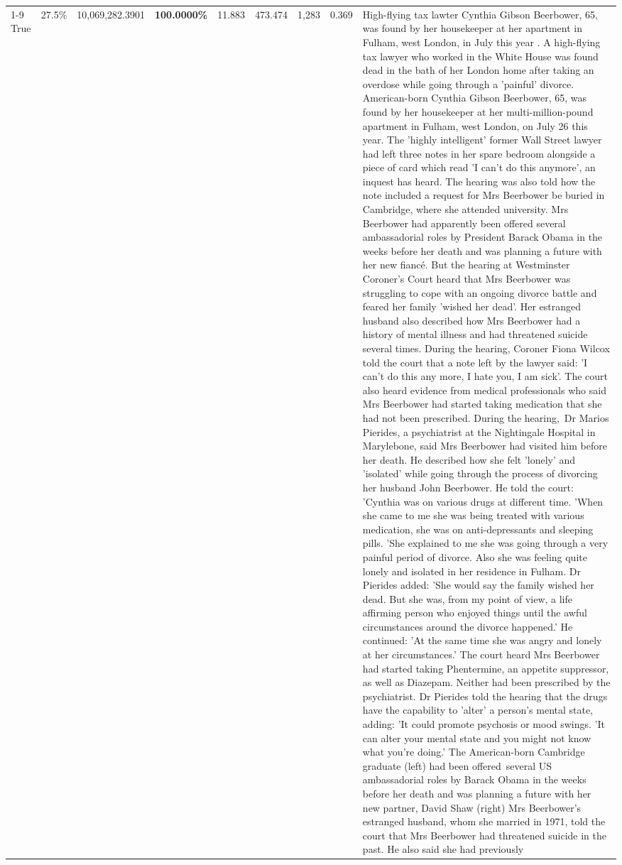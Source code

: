 \begin{table}[H]
\begin{tabular}{lllrlllll}
\cline{1-9}
True & 27.5\% & 10,069,282.3901 & \bfseries \color{red} 100.0000\% & 11.883 & 473.474 & 1,283 & 0.369 & High-flying tax lawter Cynthia Gibson Beerbower, 65, was found by her housekeeper at her apartment in Fulham, west London, in July this year . A high-flying tax lawyer who worked in the White House was found dead in the bath of her London home after taking an overdose while going through a 'painful' divorce. American-born Cynthia Gibson Beerbower, 65, was found by her housekeeper at her multi-million-pound apartment in Fulham, west London, on July 26 this year. The 'highly intelligent' former Wall Street lawyer had left three notes in her spare bedroom alongside a piece of card which read 'I can't do this anymore', an inquest has heard. The hearing was also told how the note included a request for Mrs Beerbower be buried in Cambridge, where she attended university. Mrs Beerbower had apparently been offered several ambassadorial roles by President Barack Obama in the weeks before her death and was planning a future with her new fiancé. But the hearing at Westminster Coroner's Court heard that Mrs Beerbower was struggling to cope with an ongoing divorce battle and feared her family 'wished her dead'. Her estranged husband also described how Mrs Beerbower had a history of mental illness and had threatened suicide several times. During the hearing, Coroner Fiona Wilcox told the court that a note left by the lawyer said: 'I can't do this any more, I hate you, I am sick'. The court also heard evidence from medical professionals who said Mrs Beerbower had started taking medication that she had not been prescribed. During the hearing, Dr Marios Pierides, a psychiatrist at the Nightingale Hospital in Marylebone, said Mrs Beerbower had visited him before her death. He described how she felt 'lonely' and 'isolated' while going through the process of divorcing her husband John Beerbower. He told the court: 'Cynthia was on various drugs at different time. 'When she came to me she was being treated with various medication, she was on anti-depressants and sleeping pills. 'She explained to me she was going through a very painful period of divorce. Also she was feeling quite lonely and isolated in her residence in Fulham. Dr Pierides added: 'She would say the family wished her dead. But she was, from my point of view, a life affirming person who enjoyed things until the awful circumstances around the divorce happened.' He continued: 'At the same time she was angry and lonely at her circumstances.' The court heard Mrs Beerbower had started taking Phentermine, an appetite suppressor, as well as Diazepam. Neither had been prescribed by the psychiatrist. Dr Pierides told the hearing that the drugs have the capability to 'alter' a person's mental state, adding: 'It could promote psychosis or mood swings. 'It can alter your mental state and you might not know what you're doing.' The American-born Cambridge graduate (left) had been offered several US ambassadorial roles by Barack Obama in the weeks before her death and was planning a future with her new partner, David Shaw (right) Mrs Beerbower's estranged husband, whom she married in 1971, told the court that Mrs Beerbower had threatened suicide in the past. He also said she had previously 
\end{tabular}
\end{table}
